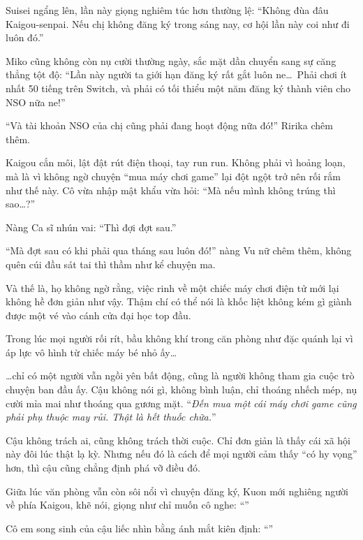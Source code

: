 \documentclass[../main.tex]{subfiles}
\begin{document}
Suisei ngẩng lên, lần này giọng nghiêm túc hơn thường lệ: ``Không đùa đâu Kaigou-senpai. Nếu chị không đăng ký trong sáng nay, cơ hội lần này coi như đi luôn đó.''

Miko cũng không còn nụ cười thường ngày, sắc mặt dần chuyển sang sự căng thẳng tột độ: ``Lần này người ta giới hạn đăng ký rất gắt luôn ne\dots\ Phải chơi ít nhất 50 tiếng trên Switch, và phải có tối thiểu một năm đăng ký thành viên cho NSO nữa ne!''

``Và tài khoản NSO của chị cũng phải đang hoạt động nữa đó!'' Ririka chêm thêm.

Kaigou cắn môi, lật đật rút điện thoại, tay run run. Không phải vì hoảng loạn, mà là vì không ngờ chuyện ``mua máy chơi game'' lại đột ngột trở nên rối rắm như thế này. Cô vừa nhập mật khẩu vừa hỏi: ``Mà nếu mình không trúng thì sao\dots?''

Nàng Ca sĩ nhún vai: ``Thì đợi đợt sau.''

``Mà đợt sau có khi phải qua tháng sau luôn đó!'' nàng Vu nữ chêm thêm, không quên cúi đầu sát tai thì thầm như kể chuyện ma.

Và thế là, họ không ngờ rằng, việc rinh về một chiếc máy chơi điện tử mới lại không hề đơn giản như vậy. Thậm chí có thể nói là khốc liệt không kém gì giành được một vé vào cánh cửa đại học top đầu.

Trong lúc mọi người rối rít, bầu không khí trong căn phòng như đặc quánh lại vì áp lực vô hình từ chiếc máy bé nhỏ ấy\dots

\dots chỉ có một người vẫn ngồi yên bất động, cũng là người không tham gia cuộc trò chuyện ban đầu ấy. Cậu không nói gì, không bình luận, chỉ thoáng nhếch mép, nụ cười mỉa mai như thoáng qua gương mặt. ``\textit{Đến mua một cái máy chơi game cũng phải phụ thuộc may rủi. Thật là hết thuốc chữa.}''

Cậu không trách ai, cũng không trách thời cuộc. Chỉ đơn giản là thấy cái xã hội này đôi lúc thật lạ kỳ. Nhưng nếu đó là cách để mọi người cảm thấy ``có hy vọng'' hơn, thì cậu cũng chẳng định phá vỡ điều đó.

Giữa lúc văn phòng vẫn còn sôi nổi vì chuyện đăng ký, Kuon mới nghiêng người về phía Kaigou, khẽ nói, giọng như chỉ muốn cô nghe: ``''

Cô em song sinh của cậu liếc nhìn bằng ánh mắt kiên định: ``''
\end{document}

